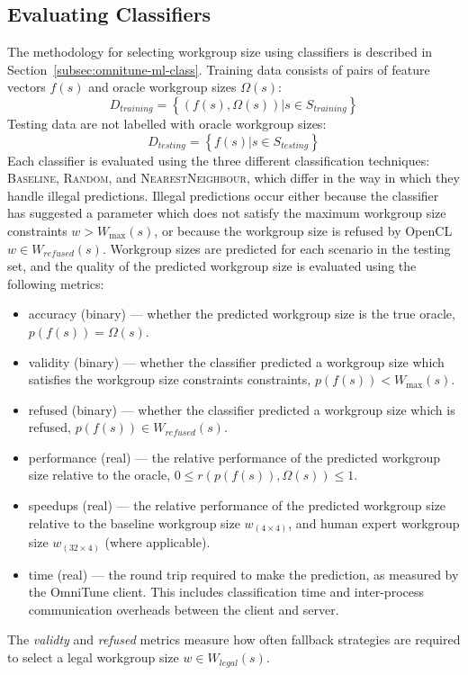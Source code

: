 \subsection{Evaluating Classifiers}

The methodology for selecting workgroup size using classifiers is
described in Section~\ref{subsec:omnitune-ml-class}. Training data
consists of pairs of feature vectors $f(s)$ and oracle workgroup sizes
$\Omega(s)$:
%
\begin{equation}
  D_{training} = \left\{ (f(s),\Omega(s)) | s \in S_{training} \right\}
\end{equation}
%
Testing data are not labelled with oracle workgroup sizes:
%
\begin{equation}
  D_{testing} = \left\{ f(s) | s \in S_{testing} \right\}
\end{equation}
%
Each classifier is evaluated using the three different classification
techniques: \textsc{Baseline}, \textsc{Random}, and
\textsc{NearestNeighbour}, which differ in the way in which they
handle illegal predictions. Illegal predictions occur either because
the classifier has suggested a parameter which does not satisfy the
maximum workgroup size constraints $w > W_{\max}(s)$, or because the
workgroup size is refused by OpenCL $w \in W_{refused}(s)$. Workgroup
sizes are predicted for each scenario in the testing set, and the
quality of the predicted workgroup size is evaluated using the
following metrics:
%
\begin{itemize}
\item accuracy (binary) --- whether the predicted workgroup size is
  the true oracle, $p(f(s)) = \Omega(s)$.
\item validity (binary) --- whether the classifier predicted a
  workgroup size which satisfies the workgroup size constraints
  constraints, $p(f(s)) < W_{\max}(s)$.
\item refused (binary) --- whether the classifier predicted a
  workgroup size which is refused, $p(f(s)) \in W_{refused}(s)$.
\item performance (real) --- the relative performance of the predicted
  workgroup size relative to the oracle,
  $0 \le r(p(f(s)), \Omega(s)) \le 1$.
\item speedups (real) --- the relative performance of the predicted
  workgroup size relative to the baseline workgroup size
  $w_{(4 \times 4)}$, and human expert workgroup size
  $w_{(32 \times 4)}$ (where applicable).
\item time (real) --- the round trip required to make the prediction,
  as measured by the OmniTune client. This includes classification
  time and inter-process communication overheads between the client
  and server.
\end{itemize}
%
The \emph{validty} and \emph{refused} metrics measure how often
fallback strategies are required to select a legal workgroup size
$w \in W_{legal}(s)$.


